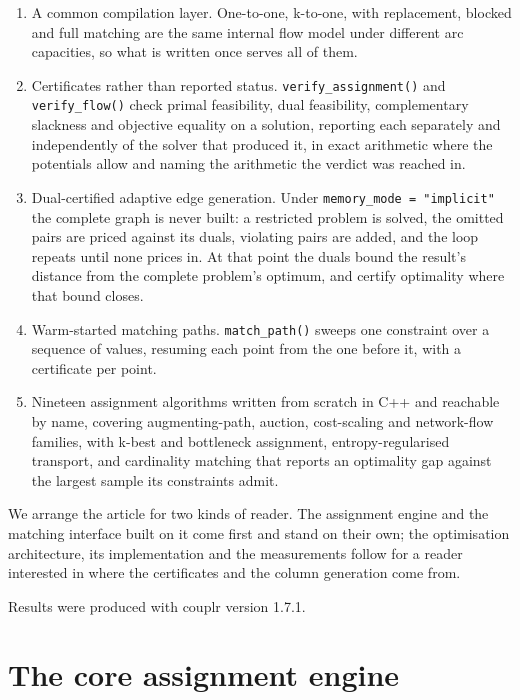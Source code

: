 \begin{enumerate}
\def\labelenumi{\arabic{enumi}.}
\tightlist
\item
  A common compilation layer. One-to-one, k-to-one, with replacement, blocked
  and full matching are the same internal flow model under different arc
  capacities, so what is written once serves all of them.
\item
  Certificates rather than reported status. \texttt{verify\_assignment()} and
  \texttt{verify\_flow()} check primal feasibility, dual feasibility, complementary
  slackness and objective equality on a solution, reporting each separately
  and independently of the solver that produced it, in exact arithmetic where
  the potentials allow and naming the arithmetic the verdict was reached in.
\item
  Dual-certified adaptive edge generation. Under
  \texttt{memory\_mode\ =\ "implicit"} the complete graph is never built: a
  restricted problem is solved, the omitted pairs are priced against its
  duals, violating pairs are added, and the loop repeats until none prices in. At that point the duals bound the result's distance from the complete
  problem's optimum, and certify optimality where that bound closes.
\item
  Warm-started matching paths. \texttt{match\_path()} sweeps one constraint over
  a sequence of values, resuming each point from the one before it, with a
  certificate per point.
\item
  Nineteen assignment algorithms written from scratch in C++ and reachable by
  name, covering augmenting-path, auction, cost-scaling and network-flow
  families, with k-best and bottleneck assignment, entropy-regularised
  transport, and cardinality matching that reports an optimality gap against
  the largest sample its constraints admit.
\end{enumerate}

We arrange the article for two kinds of reader. The assignment engine and the
matching interface built on it come first and stand on their own; the
optimisation architecture, its implementation and the measurements follow for a
reader interested in where the certificates and the column generation come
from.

Results were produced with couplr version 1.7.1.

\section{The core assignment engine}\label{the-core-assignment-engine}

